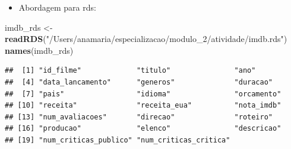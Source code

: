 \documentclass[
]{article}
\newenvironment{Shaded}{\begin{snugshade}}{\end{snugshade}}
\newcommand{\FunctionTok}[1]{\textcolor[rgb]{0.13,0.29,0.53}{\textbf{#1}}}
\newcommand{\NormalTok}[1]{#1}
\newcommand{\OtherTok}[1]{\textcolor[rgb]{0.56,0.35,0.01}{#1}}
\newcommand{\StringTok}[1]{\textcolor[rgb]{0.31,0.60,0.02}{#1}}
\providecommand{\tightlist}{%
  \setlength{\itemsep}{0pt}\setlength{\parskip}{0pt}}
\begin{document}
\begin{itemize}
\tightlist
\item
  Abordagem para rds:
\end{itemize}

\begin{Shaded}
\begin{Highlighting}[]
\NormalTok{imdb\_rds }\OtherTok{\textless{}{-}} \FunctionTok{readRDS}\NormalTok{(}\StringTok{"/Users/anamaria/especializacao/modulo\_2/atividade/imdb.rds"}\NormalTok{)}
\FunctionTok{names}\NormalTok{(imdb\_rds)}
\end{Highlighting}
\end{Shaded}

\begin{verbatim}
##  [1] "id_filme"             "titulo"               "ano"                 
##  [4] "data_lancamento"      "generos"              "duracao"             
##  [7] "pais"                 "idioma"               "orcamento"           
## [10] "receita"              "receita_eua"          "nota_imdb"           
## [13] "num_avaliacoes"       "direcao"              "roteiro"             
## [16] "producao"             "elenco"               "descricao"           
## [19] "num_criticas_publico" "num_criticas_critica"
\end{verbatim}
\end{document}
